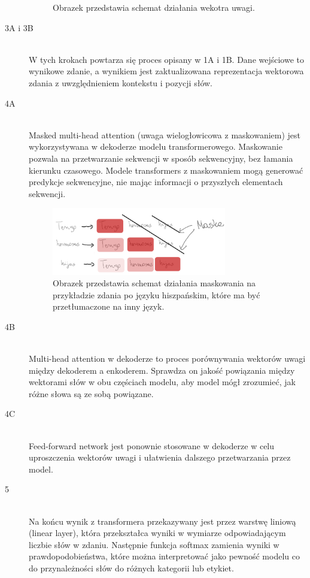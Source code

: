 \documentclass{article}
\begin{document}
\begin{description}
\begin{figure}[h]
        \caption{Obrazek przedstawia schemat działania wekotra uwagi.}
        \label{fig:mesh1}
    \end{figure}
      \item[3A i 3B ] \hfill \\
      W tych krokach powtarza się proces opisany w 1A i 1B. Dane wejściowe to wynikowe zdanie, a wynikiem jest zaktualizowana reprezentacja wektorowa zdania z uwzględnieniem kontekstu i pozycji słów.
      \item[4A  ] \hfill \\
      Masked multi-head attention (uwaga wielogłowicowa z maskowaniem) jest wykorzystywana w dekoderze modelu transformerowego. Maskowanie pozwala na przetwarzanie sekwencji w sposób sekwencyjny, bez łamania kierunku czasowego. Modele transformers z maskowaniem mogą generować predykcje sekwencyjne, nie mając informacji o przyszłych elementach sekwencji.
      \begin{figure}[h]
        \centering
        \includegraphics[width=0.75\textwidth]{images/maska.png}
        \caption{Obrazek przedstawia schemat działania maskowania na przykładzie zdania po języku hiszpańskim, które ma być przetłumaczone na inny język.}
        \label{fig:mesh1}
    \end{figure}
      \item[4B ] \hfill \\
      Multi-head attention w dekoderze to proces porównywania wektorów uwagi między dekoderem a enkoderem. Sprawdza on jakość powiązania między wektorami słów w obu częściach modelu, aby model mógł zrozumieć, jak różne słowa są ze sobą powiązane.
      \item[4C  ] \hfill \\
      Feed-forward network jest ponownie stosowane w dekoderze w celu uproszczenia wektorów uwagi i ułatwienia dalszego przetwarzania przez model.
      \item[5 ] \hfill \\
      Na końcu wynik z transformera przekazywany jest przez warstwę liniową (linear layer), która przekształca wyniki w wymiarze odpowiadającym liczbie słów w zdaniu. Następnie funkcja softmax zamienia wyniki w prawdopodobieństwa, które można interpretować jako pewność modelu co do przynależności słów do różnych kategorii lub etykiet.
    \end{description}
\end{document}
